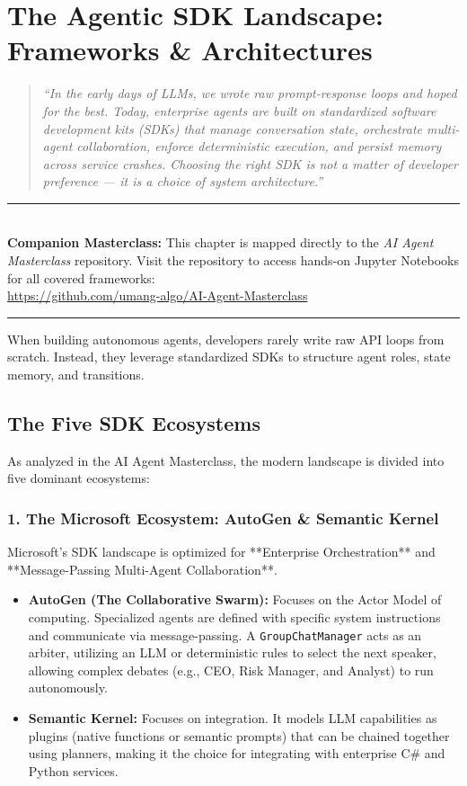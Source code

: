 \chapter{The Agentic SDK Landscape: Frameworks \& Architectures}

\begin{quote}
\textit{``In the early days of LLMs, we wrote raw prompt-response loops and hoped for the best. Today, enterprise agents are built on standardized software development kits (SDKs) that manage conversation state, orchestrate multi-agent collaboration, enforce deterministic execution, and persist memory across service crashes. Choosing the right SDK is not a matter of developer preference --- it is a choice of system architecture.''}
\end{quote}

\begin{center}
\noindent\rule{0.8\textwidth}{0.4pt} \\
\vspace{0.3em}
\textbf{Companion Masterclass:} This chapter is mapped directly to the \textit{AI Agent Masterclass} repository. Visit the repository to access hands-on Jupyter Notebooks for all covered frameworks: \\
\url{https://github.com/umang-algo/AI-Agent-Masterclass} \\
\noindent\rule{0.8\textwidth}{0.4pt}
\end{center}

When building autonomous agents, developers rarely write raw API loops from scratch. Instead, they leverage standardized SDKs to structure agent roles, state memory, and transitions.

\section{The Five SDK Ecosystems}

As analyzed in the AI Agent Masterclass, the modern landscape is divided into five dominant ecosystems:

\subsection{1. The Microsoft Ecosystem: AutoGen \& Semantic Kernel}
Microsoft's SDK landscape is optimized for **Enterprise Orchestration** and **Message-Passing Multi-Agent Collaboration**.
\begin{itemize}
    \item \textbf{AutoGen (The Collaborative Swarm):} Focuses on the Actor Model of computing. Specialized agents are defined with specific system instructions and communicate via message-passing. A \texttt{GroupChatManager} acts as an arbiter, utilizing an LLM or deterministic rules to select the next speaker, allowing complex debates (e.g., CEO, Risk Manager, and Analyst) to run autonomously.
    \item \textbf{Semantic Kernel:} Focuses on integration. It models LLM capabilities as plugins (native functions or semantic prompts) that can be chained together using planners, making it the choice for integrating with enterprise C\# and Python services.
\end{itemize}

